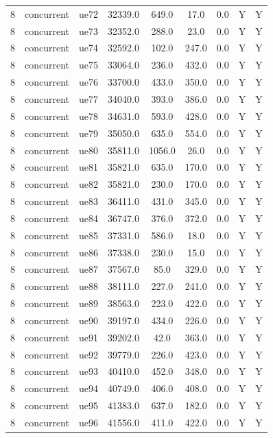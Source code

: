 \begin{table}[ht]
\begin{tabular}{|c|c|c|c|c|c|c|c|c|}
8 & concurrent & ue72 & 32339.0 & 649.0 & 17.0 & 0.0 & Y & Y \\
8 & concurrent & ue73 & 32352.0 & 288.0 & 23.0 & 0.0 & Y & Y \\
8 & concurrent & ue74 & 32592.0 & 102.0 & 247.0 & 0.0 & Y & Y \\
8 & concurrent & ue75 & 33064.0 & 236.0 & 432.0 & 0.0 & Y & Y \\
8 & concurrent & ue76 & 33700.0 & 433.0 & 350.0 & 0.0 & Y & Y \\
8 & concurrent & ue77 & 34040.0 & 393.0 & 386.0 & 0.0 & Y & Y \\
8 & concurrent & ue78 & 34631.0 & 593.0 & 428.0 & 0.0 & Y & Y \\
8 & concurrent & ue79 & 35050.0 & 635.0 & 554.0 & 0.0 & Y & Y \\
8 & concurrent & ue80 & 35811.0 & 1056.0 & 26.0 & 0.0 & Y & Y \\
8 & concurrent & ue81 & 35821.0 & 635.0 & 170.0 & 0.0 & Y & Y \\
8 & concurrent & ue82 & 35821.0 & 230.0 & 170.0 & 0.0 & Y & Y \\
8 & concurrent & ue83 & 36411.0 & 431.0 & 345.0 & 0.0 & Y & Y \\
8 & concurrent & ue84 & 36747.0 & 376.0 & 372.0 & 0.0 & Y & Y \\
8 & concurrent & ue85 & 37331.0 & 586.0 & 18.0 & 0.0 & Y & Y \\
8 & concurrent & ue86 & 37338.0 & 230.0 & 15.0 & 0.0 & Y & Y \\
8 & concurrent & ue87 & 37567.0 & 85.0 & 329.0 & 0.0 & Y & Y \\
8 & concurrent & ue88 & 38111.0 & 227.0 & 241.0 & 0.0 & Y & Y \\
8 & concurrent & ue89 & 38563.0 & 223.0 & 422.0 & 0.0 & Y & Y \\
8 & concurrent & ue90 & 39197.0 & 434.0 & 226.0 & 0.0 & Y & Y \\
8 & concurrent & ue91 & 39202.0 & 42.0 & 363.0 & 0.0 & Y & Y \\
8 & concurrent & ue92 & 39779.0 & 226.0 & 423.0 & 0.0 & Y & Y \\
8 & concurrent & ue93 & 40410.0 & 452.0 & 348.0 & 0.0 & Y & Y \\
8 & concurrent & ue94 & 40749.0 & 406.0 & 408.0 & 0.0 & Y & Y \\
8 & concurrent & ue95 & 41383.0 & 637.0 & 182.0 & 0.0 & Y & Y \\
8 & concurrent & ue96 & 41556.0 & 411.0 & 422.0 & 0.0 & Y & Y \\

\end{tabular}
\end{table}
